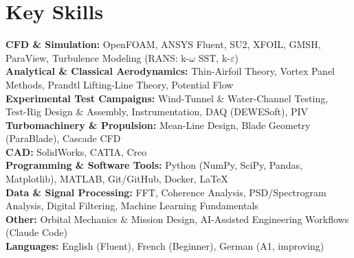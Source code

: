 \documentclass[a4paper,8pt]{article}
\begin{document}
\section{Key Skills}
\color[HTML]{371e77}\textbf{CFD \& Simulation:} \color[HTML]{000000}OpenFOAM, ANSYS Fluent, SU2, XFOIL, GMSH, ParaView, Turbulence Modeling (RANS: k-$\omega$ SST, k-$\varepsilon$)
\normalcolor\\
\color[HTML]{371e77}\textbf{Analytical \& Classical Aerodynamics:} \color[HTML]{000000}Thin-Airfoil Theory, Vortex Panel Methods, Prandtl Lifting-Line Theory, Potential Flow
\normalcolor\\
\color[HTML]{371e77}\textbf{Experimental Test Campaigns:} \color[HTML]{000000}Wind-Tunnel \& Water-Channel Testing, Test-Rig Design \& Assembly, Instrumentation, DAQ (DEWESoft), PIV
\normalcolor\\
\color[HTML]{371e77}\textbf{Turbomachinery \& Propulsion:} \color[HTML]{000000}Mean-Line Design, Blade Geometry (ParaBlade), Cascade CFD
\normalcolor\\
\color[HTML]{371e77}\textbf{CAD:} \color[HTML]{000000}SolidWorks, CATIA, Creo
\normalcolor\\
\color[HTML]{371e77}\textbf{Programming \& Software Tools:} \color[HTML]{000000}Python (NumPy, SciPy, Pandas, Matplotlib), MATLAB, Git/GitHub, Docker, LaTeX
\normalcolor\\
\color[HTML]{371e77}\textbf{Data \& Signal Processing:} \color[HTML]{000000}FFT, Coherence Analysis, PSD/Spectrogram Analysis, Digital Filtering, Machine Learning Fundamentals
\normalcolor\\
\color[HTML]{371e77}\textbf{Other:} \color[HTML]{000000}Orbital Mechanics \& Mission Design, AI-Assisted Engineering Workflows (Claude Code)
\normalcolor\\
\color[HTML]{371e77}\textbf{Languages:} \color[HTML]{000000}English (Fluent), French (Beginner), German (A1, improving)
\normalcolor

\end{document}
